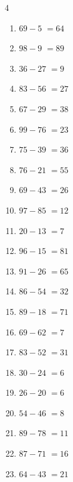 \begin{multicols}{4}
\begin{enumerate}
  \item $69-5$
        $=64$

  \item $98-9$
        $=89$

  \item $36-27$
        $=9$

  \item $83-56$
        $=27$

  \item $67-29$
        $=38$

  \item $99-76$
        $=23$

  \item $75-39$
        $=36$

  \item $76-21$
        $=55$

  \item $69-43$
        $=26$

  \item $97-85$
        $=12$

\columnbreak %

\resetques

  \item $20-13$
        $=7$

  \item $96-15$
        $=81$

  \item $91-26$
        $=65$

  \item $86-54$
        $=32$

  \item $89-18$
        $=71$

  \item $69-62$
        $=7$

  \item $83-52$
        $=31$

  \item $30-24$
        $=6$

  \item $26-20$
        $=6$

  \item $54-46$
        $=8$

  \item $89-78$
        $=11$

  \item $87-71$
        $=16$

  \item $64-43$
        $=21$


\end{enumerate}
\end{multicols}
